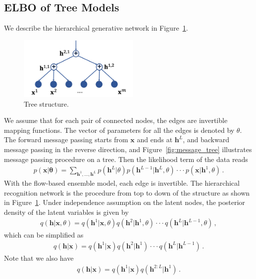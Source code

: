 \documentclass[twoside]{article}
\begin{document}
\subsection{ELBO of Tree Models}\label{appd:tree_elbo}



We describe the hierarchical generative network in Figure~\ref{fig:tree-d}. 
\begin{figure}[H]
    \centering
    \includegraphics[width=2.3in]{fig/tree_direct.png}
    \caption{Tree structure.}
    \label{fig:tree-d}
\end{figure}

We assume that for each pair of connected nodes, the edges are invertible mapping functions. 
The vector of parameters for all the edges is denoted by $\theta$.
The forward message passing starts from $\mathbf{x}$ and ends at $\mathbf{h}^L$, and backward message passing in the reverse direction, and Figure~\ref{fig:message_tree} illustrates message passing procedure on a tree. 
Then the likelihood term of the data reads
\begin{align*}
p(\mathbf{x}| \mathbf{\theta}) = \sum_{\mathbf{h}^1, ..., \mathbf{h}^L} p(\mathbf{h}^L | \theta)p(\mathbf{h}^{L-1} | \mathbf{h}^{L},\theta) \cdot \cdot  \cdot  p(\mathbf{x} | \mathbf{h}^{1}, \theta) \, .
\end{align*}
With the flow-based ensemble model, each edge is invertible.   
The hierarchical recognition network is the procedure from top to down of the structure as shown in Figure~\ref{fig:tree-d}.  
Under independence assumption on the latent nodes, the posterior density of the latent variables is given by
\begin{align*}
q(\mathbf{h}| \mathbf{x}, \theta ) = q(\mathbf{h}^1 | \mathbf{x}, \theta)  q(\mathbf{h}^2 | \mathbf{h}^1, \theta) \cdot \cdot  \cdot  q(\mathbf{h}^{L} | \mathbf{h}^{L-1}, \theta) \, ,
\end{align*}
which can be simplified as 
\begin{align*}
q(\mathbf{h}| \mathbf{x}) = q(\mathbf{h}^1 | \mathbf{x})  q(\mathbf{h}^2 | \mathbf{h}^1) \cdot \cdot  \cdot  q(\mathbf{h}^{L} | \mathbf{h}^{L-1}) \, .
\end{align*}
Note that we also have 
\begin{align} \label{eq:chain}
q(\mathbf{h}| \mathbf{x}) = q(\mathbf{h}^1 | \mathbf{x})  q(\mathbf{h}^{2:L} | \mathbf{h}^1) \, .
\end{align}
\end{document}
